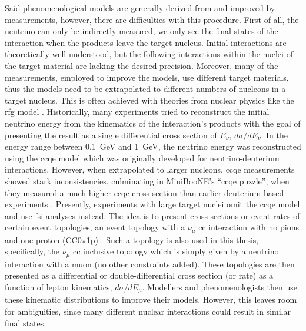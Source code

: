 Said phenomenological models are generally derived from and improved by measurements, however, there are difficulties with this procedure. First of all, the neutrino can only be indirectly measured, \ie we only see the final states of the interaction when the products leave the target nucleus. Initial interactions are theoretically well understood, but the following interactions within the nuclei of the target material are lacking the desired precision. Moreover, many of the measurements, employed to improve the models, use different target materials, thus the models need to be extrapolated to different numbers of nucleons in a target nucleus. This is often achieved with theories from nuclear physics like the \gls{rfg} model \cite{ProgressInNuMeasurements}. Historically, many experiments tried to reconstruct the initial neutrino energy from the kinematics of the interaction's products with the goal of presenting the result as a single differential cross section of $E_\nu$, \ie $d\sigma/dE_\nu$. In the energy range between \SI{0.1}{\giga\electronvolt} and \SI{1}{\giga\electronvolt}, the neutrino energy was reconstructed using the \gls{ccqe} model \cite{NuQuasiElasticScattering} which was originally developed for neutrino-deuterium interactions. However, when extrapolated to larger nucleons, \gls{ccqe} measurements showed stark inconsistencies, culminating in MiniBooNE's ``\gls{ccqe} puzzle'', when they measured a much higher \gls{ccqe} cross section than earlier deuterium based experiments \cite{AxialMassMiniBooNE}. Presently, experiments with large target nuclei omit the \gls{ccqe} model and use \gls{fsi} analyses instead. The idea is to present cross sections or event rates of certain event topologies, \eg an event topology with a $\nu_\mu$ \gls{cc} interaction with no pions and one proton (CC0$\pi$1p) \cite{ProgressInNuMeasurements}. Such a topology is also used in this thesis, specifically, the $\nu_\mu$ \gls{cc} inclusive topology which is simply given by a neutrino interaction with a muon (no other constraints added). These topologies are then presented as a differential or double-differential cross section (or rate) as a function of lepton kinematics, \eg $d\sigma/dE_\mu$. Modellers and phenomenologists then use these kinematic distributions to improve their models. However, this leaves room for ambiguities, since many different nuclear interactions could result in similar final states. 

